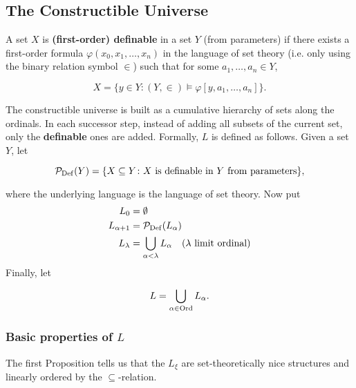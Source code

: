\subsection{The Constructible Universe}

A set $X$ is \textbf{(first-order) definable} in a set $Y$ (from parameters) if there exists a first-order formula $\varphi(x_0, x_1, \dots, x_n)$ in the language of set theory (i.e. only using the binary relation symbol $\in$) such that for some $a_1, \dots, a_n \in Y$,

\begin{equation}
X = \{ y \in Y \colon (Y,\in) \models \varphi[y, a_1, \dots, a_n] \}.
\end{equation}

The constructible universe is built as a cumulative hierarchy of sets along the ordinals. In each successor step, instead of adding all subsets of the current set, only the \textbf{definable} ones are added. Formally, $L$ is defined as follows. Given a set $Y$, let

\begin{equation}
\mathcal{P}_{\operatorname{Def}}(Y) = \{X \subseteq Y \colon X \text{ is definable in $Y$ from parameters}\},
\end{equation}

where the underlying language is the language of set theory. Now put
\begin{align*}
	L_0 & = \emptyset \\
	L_{\alpha+1} & = \mathcal{P}_{\operatorname{Def}}(L_\alpha)  \\
	L_{\lambda} & = \bigcup_{\alpha < \lambda} L_\alpha \quad  \text{($\lambda$ limit ordinal)} \\
\end{align*}
Finally, let

\begin{equation}
L = \bigcup_{\alpha \in\operatorname{Ord}} L_\alpha.
\end{equation}

\subsubsection{Basic properties of $L$}

The first Proposition tells us that the $L_\xi$ are set-theoretically nice structures and linearly ordered by the $\subseteq$-relation.

